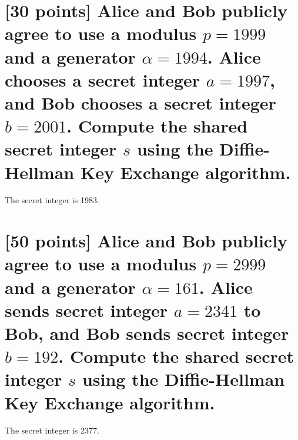 \documentclass{article}
\begin{document}
\section{[30 points] Alice and Bob publicly agree to use a modulus $p=1999$ and a generator $\alpha=1994$. Alice chooses a secret integer $a= 1997$, and Bob chooses a secret integer $b =  2001$. Compute the shared secret integer $s$ using the Diffie-Hellman Key Exchange algorithm. }

The secret integer is  1983.

\section{[50 points] Alice and Bob publicly agree to use a modulus $p=2999$ and a generator $\alpha=161$. Alice sends  secret integer $a= 2341$ to Bob, and Bob sends secret integer $b =  192$. Compute the shared secret integer $s$ using the Diffie-Hellman Key Exchange algorithm. }

The secret integer is 2377.
\end{document}
